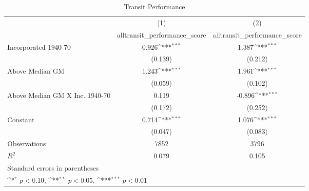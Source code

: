 \begin{table}[htbp]\centering
\def\sym#1{\ifmmode^{#1}\else\(^{#1}\)\fi}
\caption{Transit Performance}
\begin{tabular}{l*{2}{c}}
\hline\hline
                    &\multicolumn{1}{c}{(1)}&\multicolumn{1}{c}{(2)}\\
                    &\multicolumn{1}{c}{alltransit\_performance\_score}&\multicolumn{1}{c}{alltransit\_performance\_score}\\
\hline
Incorporated 1940-70&       0.926\sym{***}&       1.387\sym{***}\\
                    &     (0.139)         &     (0.212)         \\
[1em]
Above Median GM     &       1.243\sym{***}&       1.961\sym{***}\\
                    &     (0.059)         &     (0.102)         \\
[1em]
Above Median GM X Inc. 1940-70&       0.119         &      -0.896\sym{***}\\
                    &     (0.172)         &     (0.252)         \\
[1em]
Constant            &       0.714\sym{***}&       1.076\sym{***}\\
                    &     (0.047)         &     (0.083)         \\
\hline
Observations        &        7852         &        3796         \\
\(R^{2}\)           &       0.079         &       0.105         \\
\hline\hline
\multicolumn{3}{l}{\footnotesize Standard errors in parentheses}\\
\multicolumn{3}{l}{\footnotesize \sym{*} \(p<0.10\), \sym{**} \(p<0.05\), \sym{***} \(p<0.01\)}\\
\end{tabular}
\end{table}
